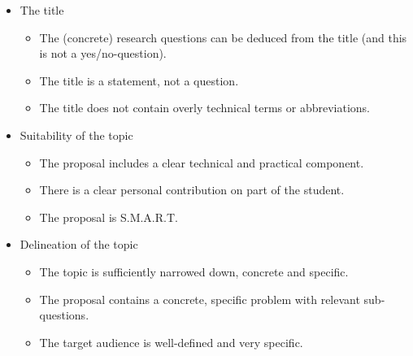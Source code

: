 \begin{itemize}
	\item The title
	\begin{itemize}
		\item The (concrete) research questions can be deduced from the title (and this is not a yes/no-question).
		\item The title is a statement, not a question.
		\item The title does not contain overly technical terms or abbreviations.
	\end{itemize}
	\item Suitability of the topic
	\begin{itemize}
		\item The proposal includes a clear technical and practical component.
		\item There is a clear personal contribution on part of the student.
		\item The proposal is S.M.A.R.T.
	\end{itemize}
	\item Delineation of the topic
	\begin{itemize}
		\item The topic is sufficiently narrowed down, concrete and specific.
		\item The proposal contains a concrete, specific problem with relevant sub-questions.
		\item The target audience is well-defined and very specific.
	\end{itemize}
	
\end{itemize}
